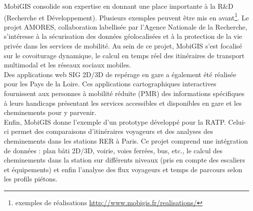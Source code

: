 MobiGIS consolide son expertise en donnant une place importante à la R\&D (Recherche et Développement). Plusieurs exemples peuvent être mis en avant\footnote{exemples de réalisations \url{http://www.mobigis.fr/realisations/}}. 
Le projet AMORES, collaboration labellisée par l’Agence Nationale de la Recherche, s’intéresse à la sécurisation des données géolocalisées et à la protection de la vie privée dans les services de mobilité. Au sein de ce projet, MobiGIS s’est focalisé sur le covoiturage dynamique, le calcul en temps réel des itinéraires de transport multimodal et les réseaux sociaux mobiles.\\ 
Des applications web SIG 2D/3D de repérage en gare a également été réalisée pour les Pays de la Loire. Ces applications cartographiques interactives fournissent aux personnes à mobilité réduite (PMR) des informations spécifiques à leurs handicaps présentant les services accessibles et disponibles en gare et les cheminements pour y parvenir. \\
Enfin, MobiGIS donne l’exemple d’un prototype développé pour la RATP. Celui-ci permet des comparaisons d’itinéraires voyageurs et des analyses des cheminements dans les stations RER à Paris. Ce projet comprend une intégration de données : plan bâti 2D/3D, voirie, voies ferrées, bus, etc., le calcul des cheminements dans la station sur différents niveaux (pris en compte des escaliers et équipements) et enfin l’analyse des flux voyageurs et temps de parcours selon les profils piétons. 

